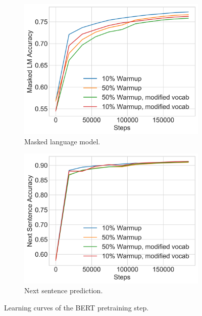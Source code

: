 \begin{figure}[h]
    \begin{subfigure}{0.5\textwidth}
        \includegraphics[width=\textwidth]{figures/charts/pretraining_learning.png}
        \caption{Masked language model.}
        \label{figure:bert_pretraining_learning_mlm}
    \end{subfigure}
    \begin{subfigure}{0.5\textwidth}
        \includegraphics[width=\textwidth]{figures/charts/pretraining_learning_nsp.png}
        \caption{Next sentence prediction.}
        \label{figure:bert_pretraining_learning_nsp}
    \end{subfigure}
    \caption{Learning curves of the \ac{BERT} pretraining step.}
    \label{figure:bert_pretraining_learning}
\end{figure}

